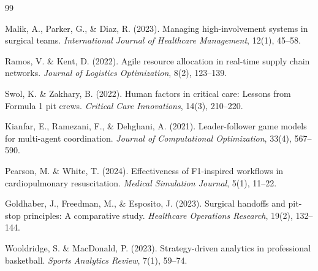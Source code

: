 \documentclass[preprint,12pt]{elsarticle}
\begin{document}

\begin{thebibliography}{99}

Malik, A., Parker, G., \& Diaz, R. (2023). Managing high-involvement systems in surgical teams. \emph{International Journal of Healthcare Management}, 12(1), 45--58.

Ramos, V. \& Kent, D. (2022). Agile resource allocation in real-time supply chain networks. \emph{Journal of Logistics Optimization}, 8(2), 123--139.

Swol, K. \& Zakhary, B. (2022). Human factors in critical care: Lessons from Formula 1 pit crews. \emph{Critical Care Innovations}, 14(3), 210--220.

Kianfar, E., Ramezani, F., \& Dehghani, A. (2021). Leader-follower game models for multi-agent coordination. \emph{Journal of Computational Optimization}, 33(4), 567--590.

Pearson, M. \& White, T. (2024). Effectiveness of F1-inspired workflows in cardiopulmonary resuscitation. \emph{Medical Simulation Journal}, 5(1), 11--22.

Goldhaber, J., Freedman, M., \& Esposito, J. (2023). Surgical handoffs and pit-stop principles: A comparative study. \emph{Healthcare Operations Research}, 19(2), 132--144.

Wooldridge, S. \& MacDonald, P. (2023). Strategy-driven analytics in professional basketball. \emph{Sports Analytics Review}, 7(1), 59--74.

\end{thebibliography}
\end{document}
